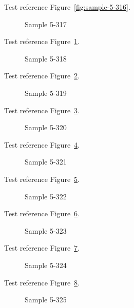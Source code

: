 Test reference Figure~\ref{fig:sample-5-316}.

\begin{figure}[tbhp]
\caption{Sample 5-317}
\label{fig:sample-5-317}
\end{figure}

Test reference Figure~\ref{fig:sample-5-317}.

\begin{figure}[tbhp]
\caption{Sample 5-318}
\label{fig:sample-5-318}
\end{figure}

Test reference Figure~\ref{fig:sample-5-318}.

\begin{figure}[tbhp]
\caption{Sample 5-319}
\label{fig:sample-5-319}
\end{figure}

Test reference Figure~\ref{fig:sample-5-319}.

\begin{figure}[tbhp]
\caption{Sample 5-320}
\label{fig:sample-5-320}
\end{figure}

Test reference Figure~\ref{fig:sample-5-320}.

\begin{figure}[tbhp]
\caption{Sample 5-321}
\label{fig:sample-5-321}
\end{figure}

Test reference Figure~\ref{fig:sample-5-321}.

\begin{figure}[tbhp]
\caption{Sample 5-322}
\label{fig:sample-5-322}
\end{figure}

Test reference Figure~\ref{fig:sample-5-322}.

\begin{figure}[tbhp]
\caption{Sample 5-323}
\label{fig:sample-5-323}
\end{figure}

Test reference Figure~\ref{fig:sample-5-323}.

\begin{figure}[tbhp]
\caption{Sample 5-324}
\label{fig:sample-5-324}
\end{figure}

Test reference Figure~\ref{fig:sample-5-324}.

\begin{figure}[tbhp]
\caption{Sample 5-325}
\label{fig:sample-5-325}
\end{figure}

